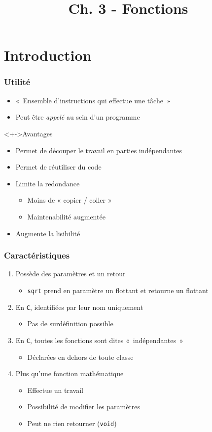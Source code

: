 


\title{Ch. 3 - Fonctions}




\section{Introduction}

\begin{frame}
\frametitle{Utilité}
\begin{itemize}[<+->]
\item «~Ensemble d'instructions qui effectue une tâche~»
\item Peut être \emph{appelé} au sein d'un programme
\end{itemize}
\begin{exampleblock}<+->{Avantages}
	\begin{itemize}[<+->]
	\item Permet de découper le travail en parties indépendantes
	\item Permet de réutiliser du code
	\item Limite la redondance
		\begin{itemize}
		\item Moins de « copier / coller »
		\item Maintenabilité augmentée
		\end{itemize}
	\item Augmente la lisibilité
	\end{itemize}
\end{exampleblock}
\end{frame}

\begin{frame}
\frametitle{Caractéristiques}
\begin{enumerate}[<+->]
\item Possède des paramètres et un retour
	\begin{itemize}
	\item \texttt{sqrt} prend en paramètre un flottant et retourne un flottant
	\end{itemize}
\item En \texttt{C}, identifiées par leur nom uniquement
	\begin{itemize}
	\item Pas de surdéfinition possible
	\end{itemize}
\item En \texttt{C}, toutes les fonctions sont dites «~indépendantes~»
	\begin{itemize}
	\item Déclarées en dehors de toute classe
	\end{itemize}
\item Plus qu'une fonction mathématique
	\begin{itemize}
	\item Effectue un travail
	\item Possibilité de modifier les paramètres
	\item Peut ne rien retourner (\lstinline|void|)
	\end{itemize}
\end{enumerate}
\end{frame}

